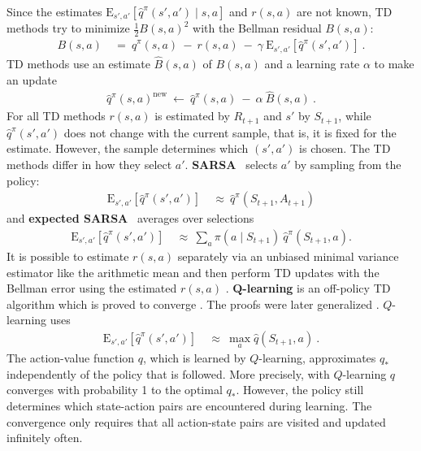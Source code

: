 \documentclass{article}
\newcommand\BQ{\bm{Q}}
\newcommand\EXP{\mathbf{\mathrm{E}}}
\newcommand\nn{\mathrm{new}}
\begin{document}
\begin{appendices}
Since the estimates $\EXP_{s',a'} \left[\hat{q}^\pi(s', a') \mid
  s,a\right]$ and $r(s,a)$ are not known,
TD methods try to minimize $\frac{1}{2}B(s,a)^2$ with the Bellman residual $B(s,a)$:
\begin{align}
\label{eq:bellman-error}
  B(s,a) \ &= \ \hat{q}^\pi(s,a) \ - \ r(s,a) \ - \
  \gamma \ \EXP_{s',a'} \left[\hat{q}^\pi(s', a')\right] \ .
\end{align}
TD methods use an estimate $\hat{B}(s,a)$ of $B(s,a)$ and a learning
rate $\alpha$ to make an update
\begin{align}
  \hat{q}^\pi(s,a)^\nn \ \leftarrow \  \hat{q}^\pi(s,a) \ - \ \alpha \
  \hat{B}(s,a) \ .
\end{align}
For all TD methods $r(s,a)$ is estimated by $R_{t+1}$ and $s'$ by
$S_{t+1}$, while
$\hat{q}^\pi(s', a')$ does not change with the
current sample, that is, it is fixed for the estimate.
However, the sample determines which $(s',a')$ is chosen.
The TD methods differ in how they select $a'$.
{\bf SARSA}~\cite{Rummery:94} selects $a'$ by sampling from the policy:
\begin{align} \nonumber
  \EXP_{s',a'} \left[\hat{q}^\pi(s', a')\right] \ &\approx \
  \hat{q}^\pi(S_{t+1}, A_{t+1})
\end{align}
and {\bf expected SARSA}~\cite{John:94} averages over selections
\begin{align} \nonumber
  \EXP_{s',a'} \left[\hat{q}^\pi(s', a')\right] \ &\approx \
  \sum_{a} \pi(a \mid S_{t+1}) \ \hat{q}^\pi(S_{t+1}, a).
\end{align}
It is possible to estimate $r(s,a)$ separately via an unbiased 
minimal variance estimator
like the arithmetic mean and then 
perform TD updates with the Bellman error
using the estimated $r(s,a)$ \cite{Romoff:18}.
{\bf $\BQ$-learning} \cite{Watkins:89} is  an
off-policy TD algorithm which is proved
to converge \cite{Watkins:92,Dayan:92}. The proofs were later generalized 
\cite{Jaakkola:94,Tsitsiklis:94}.
$Q$-learning uses
\begin{align}
  \EXP_{s',a'} \left[\hat{q}^\pi(s', a')\right] \ &\approx \
  \max_{a}  \hat{q}(S_{t+1},a) \ .
\end{align}
The action-value function $q$, which is learned by $Q$-learning, approximates $q_{*}$
independently of the policy that is followed. More precisely,
with $Q$-learning $q$ converges with probability 1 to the optimal $q_{*}$.
However, the policy still
determines which state-action pairs are encountered during learning.
The convergence only requires that all action-state pairs are visited and
updated infinitely often.





\end{appendices}
\end{document}
